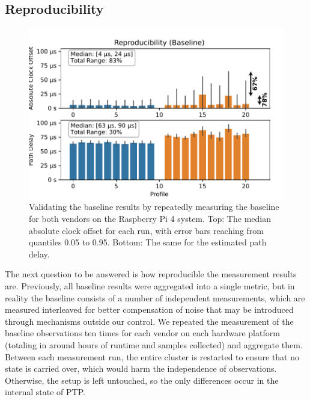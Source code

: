 \subsection{Reproducibility}
{

\renewcommand{\ptpKeyPrefix}{/reproducibility/rpi-4}


\begin{figure}
    \includegraphics[width=\linewidth]{res/generated/base/key_metric_variance.pdf}
    \caption{Validating the baseline results by repeatedly measuring the baseline for both vendors on the Raspberry Pi 4 system. Top: The median absolute clock offset for each run, with error bars reaching from quantiles 0.05 to 0.95. Bottom: The same for the estimated path delay.}
    \label{fig:baseline_reproducibility}
\end{figure}

\newcommand{\numBaselineMeasurements}{10}
\newcommand{\baselineMinutesRuntime}{\numBaselineMeasurements*4*2*20}

The next question to be answered is how reproducible the measurement results are. Previously, all baseline results were aggregated into a single metric, but in reality the baseline consists of a number of independent measurements, which are measured interleaved for better compensation of noise that may be introduced through mechanisms outside our control. We repeated the measurement of the baseline observations ten times for each vendor on each hardware platform (totaling in around \fpeval{round(\baselineMinutesRuntime/60)} hours of runtime and \fpeval{round(\baselineMinutesRuntime*60)} samples collected) and aggregate them. Between each measurement run, the entire cluster is restarted to ensure that no state is carried over, which would harm the independence of observations. Otherwise, the setup is left untouched, so the only differences occur in the internal state of PTP.

}

